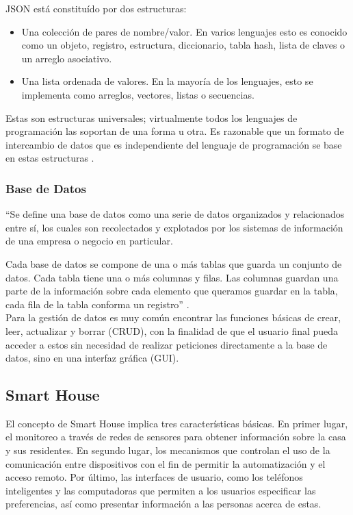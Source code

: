JSON está constituído por dos estructuras:

\begin{itemize}
	\item Una colección de pares de nombre/valor. En varios lenguajes esto es conocido como un objeto, registro, estructura, diccionario, tabla hash, lista de claves o un arreglo asociativo.
	
	\item Una lista ordenada de valores. En la mayoría de los lenguajes, esto se implementa como arreglos, vectores, listas o secuencias.
\end{itemize}

Estas son estructuras universales; virtualmente todos los lenguajes de programación las soportan de una forma u otra. Es razonable que un formato de intercambio de datos que es independiente del lenguaje de programación se base en estas estructuras \cite{JSON}.

\subsubsection{Base de Datos}

``Se define una base de datos como una serie de datos organizados y relacionados entre sí, los cuales son recolectados y explotados por los sistemas de información de una empresa o negocio en particular.

Cada base de datos se compone de una o más tablas que guarda un conjunto de datos. Cada tabla tiene una o más columnas y filas. Las columnas guardan una parte de la información sobre cada elemento que queramos guardar en la tabla, cada fila de la tabla conforma un registro'' \cite{DB}. \\

Para la gestión de datos es muy común encontrar las funciones básicas de crear, leer, actualizar y borrar (CRUD), con la finalidad de que el usuario final pueda acceder a estos sin necesidad de realizar peticiones directamente a la base de datos, sino en una interfaz gráfica (GUI).

\subsection{Smart House}

El concepto de Smart House implica tres características básicas. En primer lugar, el monitoreo a través de redes de sensores para obtener información sobre la casa y sus residentes. En segundo lugar, los mecanismos que controlan el uso de la comunicación entre dispositivos con el fin de permitir la automatización y el acceso remoto. Por último, las interfaces de usuario, como los teléfonos inteligentes y las computadoras que permiten a los usuarios especificar las preferencias, así como presentar información a las personas acerca de estas. \\

